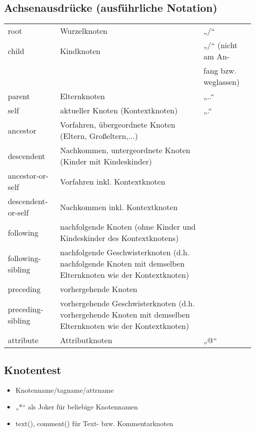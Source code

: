 \subsection{Achsenausdrücke (ausführliche Notation)}
\begin{tabularx}{\textwidth}{lXl}
root & Wurzelknoten & „/“\\
child & Kindknoten & „/“ {\tiny (nicht am An-}\\
 & & {\tiny fang bzw. weglassen)}\\
parent & Elternknoten & „..“\\
self & aktueller Knoten (Kontextknoten) & „.“\\
ancestor & Vorfahren, übergeordnete Knoten (Eltern, Großeltern,...)& \\
descendent & Nachkommen, untergeordnete Knoten (Kinder mit Kindeskinder) & \\
ancestor-or-self & Vorfahren inkl. Kontextknoten & \\
descendent-or-self & Nachkommen inkl. Kontextknoten & \\
following & nachfolgende Knoten (ohne Kinder und Kindeskinder des Kontextknotens) & \\
following-sibling & nachfolgende Geschwisterknoten (d.h. nachfolgende Knoten mit demselben Elternknoten wie der Kontextknoten) & \\
preceding & vorhergehende Knoten & \\
preceding-sibling & vorhergehende Geschwisterknoten (d.h. vorhergehende Knoten mit demselben Elternknoten wie der Kontextknoten) & \\
attribute & Attributknoten & „@“
\end{tabularx}

\subsection{Knotentest}
\begin{itemize}
\item Knotenname/tagname/attrname
\item „*“ als Joker für beliebige Knotennamen
\item text(), comment() für Text- bzw. Kommentarknoten 
\end{itemize}

